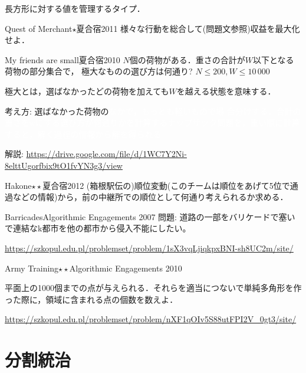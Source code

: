 長方形に対する値を管理するタイプ．

\begin{pbox}{Quest of Merchant$\star$}{夏合宿2011}
  様々な行動を総合して(問題文参照)収益を最大化せよ．

\end{pbox}

\begin{pbox}{My friends are small}{夏合宿2010}
$N$個の荷物がある．重さの合計が$W$以下となる荷物の部分集合で，
極大なものの選び方は何通り? $N \le 200, W \le 10\,000$
\end{pbox}

極大とは，選ばなかったどの荷物を加えても$W$を越える状態を意味する．

考え方: 選ばなかった荷物の\textcolor{white}{なかで，もっとも軽いもので場
  合分けする．合計の重さをwにする選び方が何通りかを計算するナップサック問題を，重い順に計算すると，解く過程の情報から解を得られる}

解説: \url{https://drive.google.com/file/d/1WC7Y2Ni-8elttUgorfbix9tO1fvYN3g3/view}

\begin{pbox}{Hakone$\star\star$}{夏合宿2012}
  (箱根駅伝の)順位変動(このチームは順位をあげて5位で通過などの情報)から，前の中継所での順位として何通り考えられるか求める．

\end{pbox}




\begin{pbox}{Barricades}{Algorithmic Engagements 2007}
問題: 道路の一部をバリケードで塞いで連結なk都市を他の都市から侵入不能にしたい。

\url{https://szkopul.edu.pl/problemset/problem/1sX3vqLjiqkpxBNI-sh8UC2m/site/}
\end{pbox}

\begin{pbox}{Army Training$\star\star$}{Algorithmic Engagements 2010}

平面上の1000個までの点が与えられる．それらを適当につないで単純多角形を作った際に，領域に含まれる点の個数を数えよ．

\url{https://szkopul.edu.pl/problemset/problem/nXF1qOIv5S88utFPI2V_0gt3/site/}
\end{pbox}
 \chapter{分割統治}\label{chapter:divide-and-conquer}

